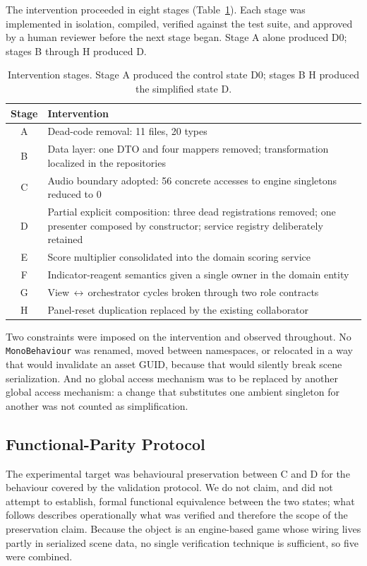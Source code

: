 \documentclass{sbc2019}%
\begin{document}
The intervention proceeded in eight stages (Table~\ref{tab:stages}). Each stage
was implemented in isolation, compiled, verified against the test suite, and
approved by a human reviewer before the next stage began. Stage A alone
produced D0; stages B through H produced D.

\begin{table}[!htbp]
\centering
\caption{Intervention stages. Stage A produced the control state D0; stages B\textendash{} H
produced the simplified state D.}\label{tab:stages}
\small
\begin{tabular}{cp{}}
\toprule
\textbf{Stage} & \textbf{Intervention} \\
\midrule
A & Dead-code removal: 11 files, 20 types \\
B & Data layer: one DTO and four mappers removed; transformation localized in the repositories \\
C & Audio boundary adopted: 56 concrete accesses to engine singletons reduced to 0 \\
D & Partial explicit composition: three dead registrations removed; one presenter composed by constructor; service registry deliberately retained \\
E & Score multiplier consolidated into the domain scoring service \\
F & Indicator-reagent semantics given a single owner in the domain entity \\
G & View\,$\leftrightarrow$\,orchestrator cycles broken through two role contracts \\
H & Panel-reset duplication replaced by the existing collaborator \\
\bottomrule
\end{tabular}
\end{table}

Two constraints were imposed on the intervention and observed throughout. No
\texttt{MonoBehaviour} was renamed, moved between namespaces, or relocated in a
way that would invalidate an asset GUID, because that would silently break
scene serialization. And no global access mechanism was to be replaced by
another global access mechanism: a change that substitutes one ambient
singleton for another was not counted as simplification.

\subsection{Functional-Parity Protocol}

The experimental target was behavioural preservation between C and D for the
behaviour covered by the validation protocol. We do not claim, and did not
attempt to establish, formal functional equivalence between the two states;
what follows describes operationally what was verified and therefore the scope
of the preservation claim. Because the object is an engine-based game whose
wiring lives partly in serialized scene data, no single verification technique
is sufficient, so five were combined.
\end{document}
